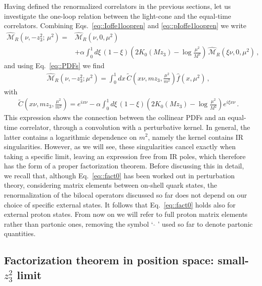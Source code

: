 Having defined the renormalized correlators in the previous sections, let us
investigate the one-loop relation between the light-cone and the equal-time
correlators. Combining Eqs.~\eqref{eq::Ioffe1loopren} and
\eqref{eq::pIoffe1loopren} we write
\begin{align}
	\label{eq::fact00}
	\widehat{\mathcal{M}}_R\left(\nu,-z_3^2;\,\mu^2\right) = 
	& {} \widehat{\mathcal{M}}_R\left(\nu,0,\mu^2\right) \nonumber \\
	& + \alpha\int_0^1 d\xi \, 
	\left(1-\xi\right) \left(2K_0\left(M z_3\right)
	-\log\frac{\mu^2}{M^2}\right)\, 
	\widehat{\mathcal{M}}_R\left(\xi\nu,0,\mu^2\right)\, ,
\end{align}
and using Eq.~\eqref{eq::PDFs} we find
\begin{align}
	\label{eq::fact0}
	\widehat{\mathcal{M}}_R\left(\nu, -z_3^2; \mu^2\right) = 
	\int_{0}^{1} dx\,\tilde{C}\left(x\nu, m z_3, \frac{\mu^2}{m^2} \right) \widehat{f}\left(x,\mu^2\right)\, ,
\end{align}
with
\begin{align}
	\tilde{C}\left(x\nu, m z_3, \frac{\mu^2}{m^2} \right) = 
	e^{i x\nu} - \alpha\int_0^1 d\xi \, \left(1-\xi\right)
	\left(2K_0\left(M z_3\right)-\log\frac{\mu^2}{M^2}\right) e^{i \xi x\nu}\, .
\end{align}
This expression shows the connection between the collinear PDFs and an
equal-time correlator, through a convolution with a perturbative kernel. In
general, the latter contains a logarithmic dependence on $m^2$, namely the
kernel contains IR singularities. However, as we will see, these
singularities cancel exactly when taking a specific limit, leaving an expression
free from IR poles, which therefore has   the form of a proper factorization
theorem.
%
Before discussing this in detail, we recall that, although Eq.~\eqref{eq::fact0}
has been worked out in perturbation theory, considering matrix elements between
on-shell quark states, the renormalization of the bilocal operators discussed so
far does not depend on our choice of specific external states. It follows that
Eq.~\eqref{eq::fact0} holds also for external proton states. From now on we will
refer to full proton matrix elements rather than partonic ones, removing the
symbol `$\,\,\widehat{}\,\,$' used so far to denote partonic quantities.


\subsection{Factorization theorem in position space: small-$z_3^2$ limit}

